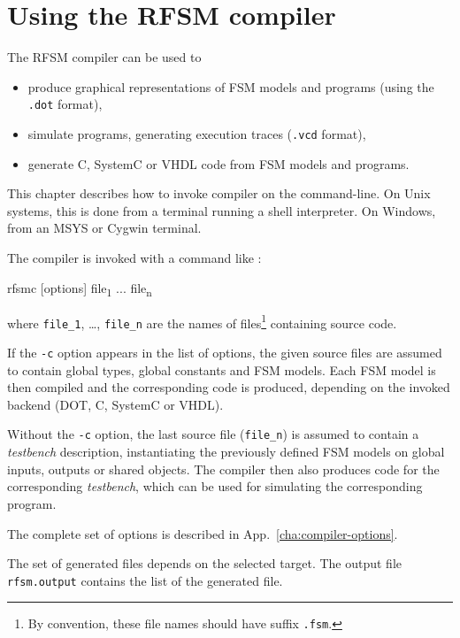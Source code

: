 \chapter{Using the RFSM compiler}
\label{cha:rfsmc}

The RFSM compiler can be used to
\begin{itemize}
\item produce graphical representations of FSM models and programs (using the \verb|.dot| format),
\item simulate programs, generating execution traces (\verb|.vcd| format),
\item generate C, SystemC or VHDL code from FSM models and programs.
\end{itemize}

This chapter describes how to invoke compiler on the command-line. On Unix systems, this is
done from a terminal running a shell interpreter. On Windows, from an MSYS or Cygwin
terminal.

\medskip
The compiler is invoked with a command like :

\begin{FVerbatim}[commandchars=\\\{\}]
rfsmc [options] file\textsubscript{1} ... file\textsubscript{n}
\end{FVerbatim}

where \texttt{file\_1}, \ldots, \texttt{file\_n} are the names of files\footnote{By convention,
  these file names should have suffix \texttt{.fsm}.} containing source code.

\medskip
If the \verb|-c| option appears in the list of options, the given source files are assumed to
contain global types, global constants and FSM models. Each FSM model is then compiled 
and the corresponding code is produced, depending on the invoked backend (DOT, C, SystemC or VHDL). 

\medskip
Without the \verb|-c| option, the last source file (\verb|file_n|) is assumed to contain a
\emph{testbench} description, instantiating the previously defined FSM models on global inputs,
outputs or shared objects. The compiler then also produces code for the corresponding
\emph{testbench}, which can be used for simulating the corresponding program. 

\medskip
The complete set of options is described in App.~\ref{cha:compiler-options}.

\medskip
The set of generated files depends on the selected target. The output file \texttt{rfsm.output}
contains the list of the generated file.

